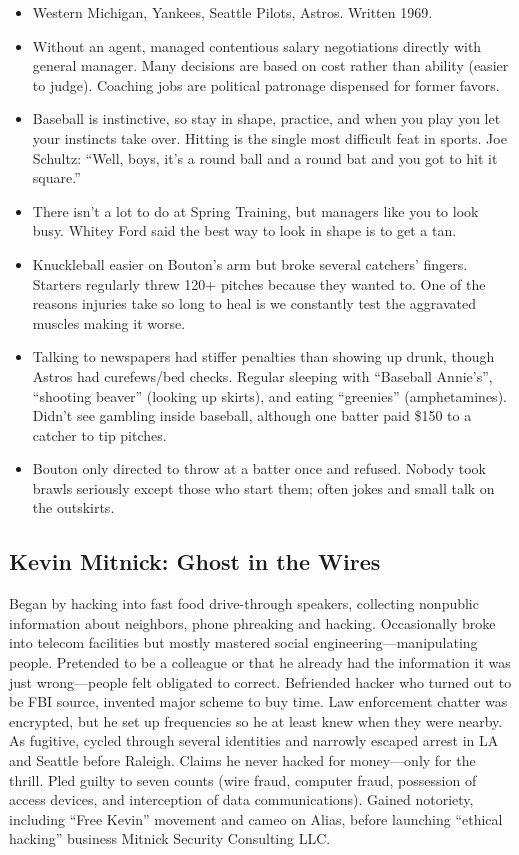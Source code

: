 \documentclass[
]{article}
\begin{document}
\begin{itemize}
\item
  Western Michigan, Yankees, Seattle Pilots, Astros. Written 1969.
\item
  Without an agent, managed contentious salary negotiations directly
  with general manager. Many decisions are based on cost rather than
  ability (easier to judge). Coaching jobs are political patronage
  dispensed for former favors.
\item
  Baseball is instinctive, so stay in shape, practice, and when you play
  you let your instincts take over. Hitting is the single most difficult
  feat in sports. Joe Schultz: ``Well, boys, it's a round ball and a
  round bat and you got to hit it square.''
\item
  There isn't a lot to do at Spring Training, but managers like you to
  look busy. Whitey Ford said the best way to look in shape is to get a
  tan.
\item
  Knuckleball easier on Bouton's arm but broke several catchers'
  fingers. Starters regularly threw 120+ pitches because they wanted to.
  One of the reasons injuries take so long to heal is we constantly test
  the aggravated muscles making it worse.
\item
  Talking to newspapers had stiffer penalties than showing up drunk,
  though Astros had curefews/bed checks. Regular sleeping with
  ``Baseball Annie's'', ``shooting beaver'' (looking up skirts), and
  eating ``greenies'' (amphetamines). Didn't see gambling inside
  baseball, although one batter paid \$150 to a catcher to tip pitches.
\item
  Bouton only directed to throw at a batter once and refused. Nobody
  took brawls seriously except those who start them; often jokes and
  small talk on the outskirts.
\end{itemize}

\hypertarget{kevin-mitnick-ghost-in-the-wires}{%
\subsection{Kevin Mitnick: Ghost in the
Wires}\label{kevin-mitnick-ghost-in-the-wires}}

Began by hacking into fast food drive-through speakers, collecting
nonpublic information about neighbors, phone phreaking and hacking.
Occasionally broke into telecom facilities but mostly mastered social
engineering---manipulating people. Pretended to be a colleague or that
he already had the information it was just wrong---people felt obligated
to correct. Befriended hacker who turned out to be FBI source, invented
major scheme to buy time. Law enforcement chatter was encrypted, but he
set up frequencies so he at least knew when they were nearby. As
fugitive, cycled through several identities and narrowly escaped arrest
in LA and Seattle before Raleigh. Claims he never hacked for
money---only for the thrill. Pled guilty to seven counts (wire fraud,
computer fraud, possession of access devices, and interception of data
communications). Gained notoriety, including ``Free Kevin'' movement and
cameo on Alias, before launching ``ethical hacking'' business Mitnick
Security Consulting LLC.
\end{document}
